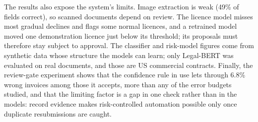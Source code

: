 The results also expose the system's limits. Image extraction is weak (49\% of fields correct), so scanned documents depend on review. The licence model misses most gradual declines and flags some normal licences, and a retrained model moved one demonstration licence just below its threshold; its proposals must therefore stay subject to approval. The classifier and risk-model figures come from synthetic data whose structure the models can learn; only Legal-BERT was evaluated on real documents, and those are US commercial contracts. Finally, the review-gate experiment shows that the confidence rule in use lets through 6.8\% wrong invoices among those it accepts, more than any of the error budgets studied, and that the limiting factor is a gap in one check rather than in the models: record evidence makes risk-controlled automation possible only once duplicate resubmissions are caught.
